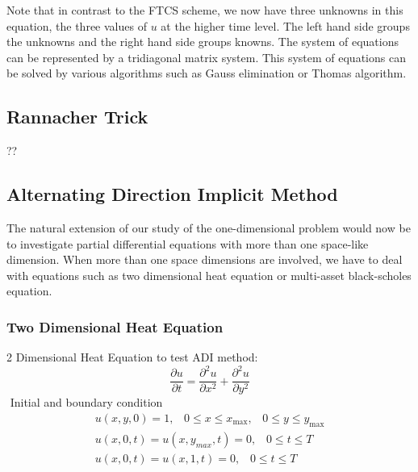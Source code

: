 \documentclass[12pt, oneside]{book}
\theoremstyle{plain}
\theoremstyle{definition}
\begin{document}
Note that in contrast to the FTCS scheme, we now have three unknowns in this equation, the three values of $u$ at the higher time level. The left hand side groups the unknowns and the right hand side groups knowns. The system of equations can be represented by a tridiagonal matrix system. This system of equations can be solved by various algorithms such as Gauss elimination or Thomas algorithm.

\subsection{Rannacher Trick}
??

\subsection{Alternating Direction Implicit Method}
The natural extension of our study of the one-dimensional problem would now be to investigate partial differential equations with more than one space-like dimension. When more than one space dimensions are involved, we have to deal with equations such as two dimensional heat equation or multi-asset black-scholes equation. 

\subsubsection{Two Dimensional Heat Equation}
2 Dimensional Heat Equation to test ADI method:
\begin{equation}
\frac{\partial u}{\partial t} = \frac{\partial^2 u}{\partial x^2} +\frac{\partial^2 u}{\partial y^2}
\end{equation}$  $
Initial and boundary condition
\begin{eqnarray}
u(x,y,0) = 1, \hspace{10pt} 0 \leq x \leq x_{\max}, \hspace{10pt} 0 \leq y \leq y_{\max} \\[10pt]
u(x, 0, t) = u(x, y_{max}, t) = 0, \hspace{10pt} 0 \leq t \leq T \\[10pt]
u(x, 0, t) = u(x, 1, t) = 0 , \hspace{10pt} 0 \leq t \leq T
\end{eqnarray}
\end{document}
